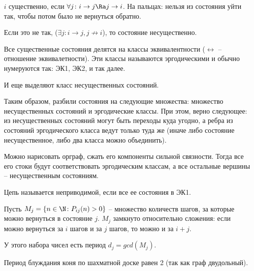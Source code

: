 \begin{Def}
$i$ существенно, если $\forall j \colon i \to j \Ra j \to i$. На пальцах: нельзя из состояния уйти так, чтобы потом было не вернуться обратно.

Если это не так, ($\exists j \colon i \to j, j \not\to i$), то состояние несущественно.
\end{Def}

Все существенные состояния делятся на классы эквивалентности ($\leftrightarrow$ -- отношение эквивалетности). 
Эти классы называются эргодическими и обычно нумеруются так: ЭК1, ЭК2, и так далее.

И еще выделяют класс несущественных состояний.

Таким образом, разбили состояния на следующие множества: множество несущественных состояний и эргодические классы.
При этом, верно следующее: из несущественных состояний могут быть переходы куда угодно, а ребра из состояний эргодического класса ведут только туда же (иначе либо состояние несущественное, либо два класса можно объединить).

Можно нарисовать орграф, сжать его компоненты сильной связности. Тогда все его стоки будут соответствовать эргодическим классам, а все остальные вершины -- несущественным состояниям.
 
\begin{Def}
Цепь называется неприводимой, если все ее состояния в ЭК1.
\end{Def}

\begin{Def}
Пусть $M_j = \{n \in \N \colon P_{ij}(n) > 0 \}$ -- множество количеств шагов, за которые можно вернуться в состояние $j$.
$M_j$ замкнуто относительно сложения: если можно вернуться за $i$ шагов и за $j$ шагов, то можно и за $i + j$.

У этого набора чисел есть период $d_j = gcd(M_j)$. 
\end{Def}

\begin{exmp}
Период блуждания коня по шахматной доске равен 2 (так как граф двудольный).
\end{exmp}

